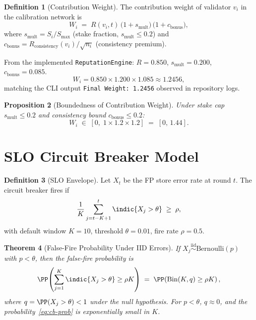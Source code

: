 \documentclass[12pt,a4paper]{article}
\newtheorem{theorem}{Theorem}[section]
\newtheorem{proposition}[theorem]{Proposition}
\theoremstyle{definition}
\newtheorem{definition}[theorem]{Definition}
\theoremstyle{remark}
\begin{document}
\begin{definition}[Contribution Weight]
\label{def:weight}
The contribution weight of validator $v_i$ in the calibration network is
\begin{equation}
  W_i \;=\; R(v_i,t)\,\bigl(1 + s_{\text{mult}}\bigr)\,\bigl(1 + c_{\text{bonus}}\bigr),
  \label{eq:contrib-weight}
\end{equation}
where
$s_{\text{mult}} = S_i/S_{\max}$ (stake fraction, $s_{\text{mult}}\le 0.2$) and
$c_{\text{bonus}} = R_{\text{consistency}}(v_i)/\sqrt{n_i}$ (consistency premium).
\end{definition}

\begin{example}
From the implemented \texttt{ReputationEngine}:
$R=0.850$, $s_{\text{mult}}=0.200$, $c_{\text{bonus}}=0.085$.
\[
  W_i = 0.850 \times 1.200 \times 1.085 \approx 1.2456,
\]
matching the CLI output \texttt{Final Weight: 1.2456} observed in repository logs.
\end{example}

\begin{proposition}[Boundedness of Contribution Weight]
Under stake cap $s_{\text{mult}}\le 0.2$ and consistency bound $c_{\text{bonus}}\le 0.2$:
\[
  W_i \;\in\; [0,\; 1 \times 1.2 \times 1.2] \;=\; [0,\,1.44].
\]
\end{proposition}

\section{SLO Circuit Breaker Model}
\label{sec:slo}

\begin{definition}[SLO Envelope]
Let $X_t$ be the FP store error rate at round $t$.  The circuit breaker fires if
\begin{equation}
  \frac{1}{K}\sum_{j=t-K+1}^{t} \indic{X_j > \theta}
  \;\ge\; \rho,
  \label{eq:cb}
\end{equation}
with default window $K=10$, threshold $\theta=0.01$, fire rate $\rho=0.5$.
\end{definition}

\begin{theorem}[False-Fire Probability Under IID Errors]
\label{thm:cb-false-fire}
If $X_j \overset{\mathrm{iid}}{\sim} \mathrm{Bernoulli}(p)$ with $p < \theta$,
then the false-fire probability is
\begin{equation}
  \PP\!\left(\sum_{j=1}^K \indic{X_j>\theta} \ge \rho K\right)
  \;=\; \PP\!\left(\mathrm{Bin}(K,q) \ge \rho K\right),
  \label{eq:cb-prob}
\end{equation}
where $q = \PP(X_j > \theta) < 1$ under the null hypothesis.
For $p < \theta$, $q\approx 0$, and the probability~\eqref{eq:cb-prob} is
exponentially small in $K$.
\end{theorem}
\end{document}
